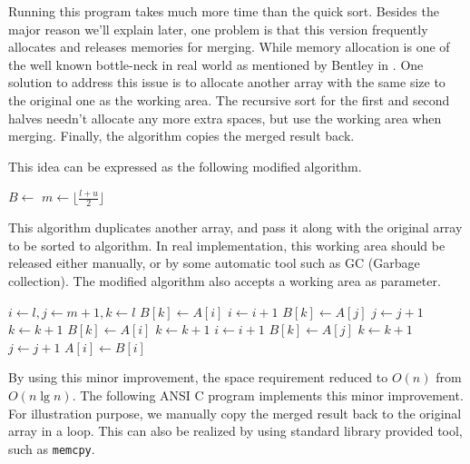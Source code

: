\documentclass[b5paper]{article}
\begin{document}
Running this program takes much more time than the quick sort. Besides the major reason we'll explain later,
one problem is that this version frequently allocates and releases memories for merging. While memory
allocation is one of the well known bottle-neck in real world as mentioned by Bentley in \cite{Bentley}.
One solution to address this issue is to allocate another array with the same size to the original one
as the working area. The recursive sort for the first and second halves needn't allocate any more
extra spaces, but use the working area when merging. Finally, the algorithm copies
the merged result back.

This idea can be expressed as the following modified algorithm.

\begin{algorithmic}[1]
  \State $B \gets $ 
  \State {}
\EndProcedure
\Statex
{}
    \State $m \gets \lfloor \frac{l + u}{2} \rfloor$
    \State {}
    \State {}
    \State {}
  \EndIf
\EndProcedure
\end{algorithmic}

This algorithm duplicates another array, and pass it along with the original array to be sorted
to  algorithm. In real implementation, this working area should be released
either manually, or by some automatic tool such as GC (Garbage collection).
The modified algorithm  also accepts a working area as parameter.

\begin{algorithmic}[1]
  \State $i \gets l, j \gets m + 1, k \gets l$
      \State $B[k] \gets A[i]$
      \State $i \gets i + 1$
    \Else
      \State $B[k] \gets A[j]$
      \State $j \gets j + 1$
    \EndIf
    \State $k \gets k + 1$
  \EndWhile
    \State $B[k] \gets A[i]$
    \State $k \gets k + 1$
    \State $i \gets i + 1$
  \EndWhile
    \State $B[k] \gets A[j]$
    \State $k \gets k + 1$
    \State $j \gets j + 1$
  \EndWhile
   
    \State $A[i] \gets B[i]$
  \EndFor
\EndProcedure
\end{algorithmic}

By using this minor improvement, the space requirement reduced to $O(n)$ from $O(n \lg n)$.
The following ANSI C program implements this minor improvement. For illustration purpose,
we manually copy the merged result back to the original array in a loop. This can also
be realized by using standard library provided tool, such as \texttt{memcpy}.
\end{document}
